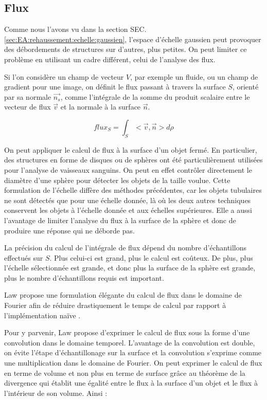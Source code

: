   \subsection{Flux}
  \label{sec:EA:rehaussement:echelle:flux}
  
  Comme nous l'avons vu dans la section SEC. \ref{sec:EA:rehaussement:echelle:gaussien}, l'espace d'échelle gaussien peut provoquer des débordements de structures sur d'autres, plus petites. On peut limiter ce problème en utilisant un cadre différent, celui de l'analyse des flux.
  
  Si l'on considère un champ de vecteur $V$, par exemple un fluide, ou un champ de gradient pour une image, on définit le flux passant à travers la surface $S$, orienté par sa normale $\vec{n_s}$, comme l'intégrale de la somme du produit scalaire entre le vecteur de flux $\vec{v}$ et la normale à la surface $\vec{n}$.
  
  \begin{equation}
  flux_S = \int_{S}< \vec{v},\vec{n} > d\rho
  \end{equation}
  
  On peut appliquer le calcul de flux à la surface d'un objet fermé. En particulier, des structures en forme de disques ou de sphères ont été particulièrement utilisées pour l'analyse de vaisseaux sanguins. On peut en effet contrôler directement le diamètre d'une sphère pour détecter les objets de la taille voulue. Cette formulation de l'échelle diffère des méthodes précédentes, car les objets tubulaires ne sont détectés que pour une échelle donnée, là où les deux autres techniques conservent les objets à l'échelle donnée et aux échelles supérieures. Elle a aussi l'avantage de limiter l'analyse du flux à la surface de la sphère et donc de produire une réponse qui ne déborde pas.
  
  La précision du calcul de l'intégrale de flux dépend du nombre d'échantillons effectués sur $S$. Plus celui-ci est grand, plus le calcul est coûteux. De plus, plus l'échelle sélectionnée est grande, et donc plus la surface de la sphère est grande, plus le nombre d'échantillons requis est important.
  
  Law propose une formulation élégante du calcul de flux dans le domaine de Fourier afin de réduire drastiquement le temps de calcul par rapport à l'implémentation naïve \cite{Law2009_efficient_implementation}.
  
  Pour y parvenir, Law propose d'exprimer le calcul de flux sous la forme d'une convolution dans le domaine temporel. L'avantage de la convolution est double, on évite l'étape d'échantillonage sur la surface et la convolution s'exprime comme une multiplication dans le domaine de Fourier. On peut exprimer le calcul de flux en terme de volume et non plus en terme de surface grâce au théorème de la divergence qui établit une égalité entre le flux à la surface d'un objet et le flux à l'intérieur de son volume. Ainsi :
  
